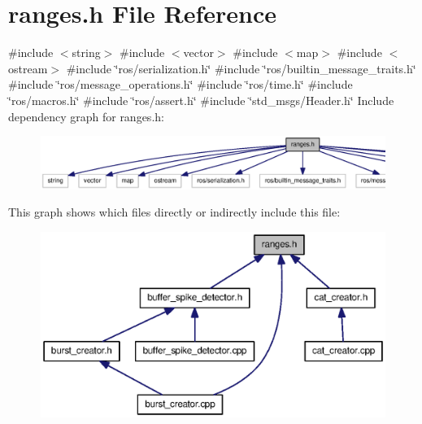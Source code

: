 \section{ranges.\-h \-File \-Reference}
\label{ranges_8h}
{\ttfamily \#include $<$string$>$}\*
{\ttfamily \#include $<$vector$>$}\*
{\ttfamily \#include $<$map$>$}\*
{\ttfamily \#include $<$ostream$>$}\*
{\ttfamily \#include \char`\"{}ros/serialization.\-h\char`\"{}}\*
{\ttfamily \#include \char`\"{}ros/builtin\-\_\-message\-\_\-traits.\-h\char`\"{}}\*
{\ttfamily \#include \char`\"{}ros/message\-\_\-operations.\-h\char`\"{}}\*
{\ttfamily \#include \char`\"{}ros/time.\-h\char`\"{}}\*
{\ttfamily \#include \char`\"{}ros/macros.\-h\char`\"{}}\*
{\ttfamily \#include \char`\"{}ros/assert.\-h\char`\"{}}\*
{\ttfamily \#include \char`\"{}std\-\_\-msgs/\-Header.\-h\char`\"{}}\*
\-Include dependency graph for ranges.\-h\-:\nopagebreak
\begin{figure}[H]
\begin{center}
\leavevmode
\includegraphics[width=350pt]{ranges_8h__incl}
\end{center}
\end{figure}
\-This graph shows which files directly or indirectly include this file\-:\nopagebreak
\begin{figure}[H]
\begin{center}
\leavevmode
\includegraphics[width=350pt]{ranges_8h__dep__incl}
\end{center}
\end{figure}
